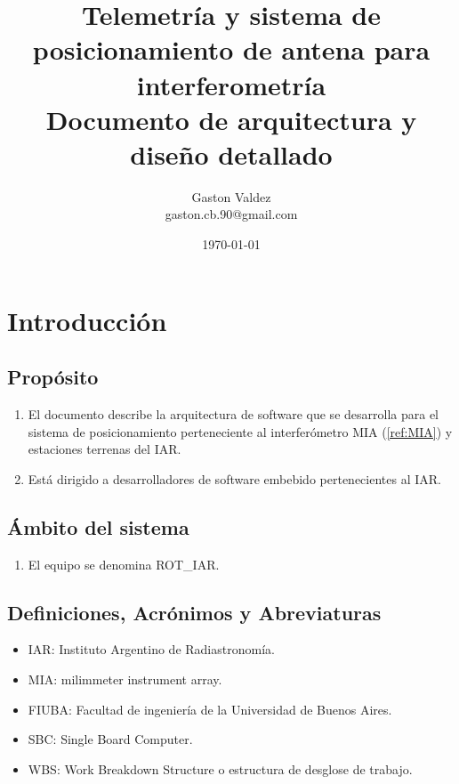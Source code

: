 \documentclass[12pt,a4paper, twosite]{article}
\date{\today}
\author{Gaston Valdez \\ gaston.cb.90@gmail.com}
\title{Telemetría y sistema de posicionamiento de antena para interferometría \\ Documento de arquitectura y diseño detallado  	}
\begin{document}
\begin{titlepage}
	\maketitle
\end{titlepage}	
	\tableofcontents
	
	\newpage
	
\section{Introducción}
\label{sec:org60390fa}


	

\subsection{Propósito}
\label{sec:org434c3ef}
\begin{enumerate}
	\item El documento describe la arquitectura de software que se desarrolla para el sistema de posicionamiento perteneciente al interferómetro MIA (\ref{ref:MIA}) y estaciones terrenas del IAR.  
	\item Está dirigido a desarrolladores de software embebido pertenecientes al IAR.
	
\end{enumerate}	
	
	
	\subsection{Ámbito del sistema}
	\label{sec:org12e44a1}
	\begin{enumerate}
		\item El equipo se denomina ROT\_IAR. 
	\end{enumerate}
	\subsection{Definiciones, Acrónimos y Abreviaturas}
	\label{sec:orgb158e36}
	\begin{itemize}
		\item IAR: Instituto Argentino de Radiastronomía.
		\item MIA: milimmeter instrument array.
		\item FIUBA: Facultad de ingeniería de la Universidad de Buenos Aires.  		
		\item SBC: Single Board Computer. 
		\item WBS: Work Breakdown Structure o estructura de desglose de trabajo.  	
	\end{itemize}
	
\end{document}
